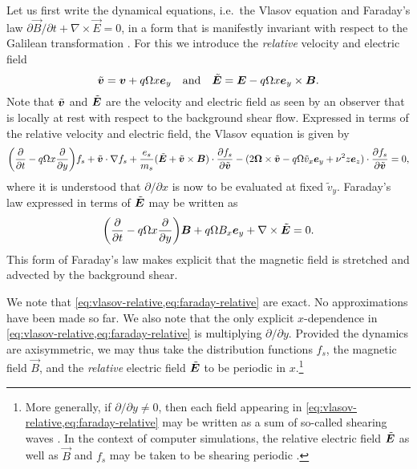 \documentclass[aps,pre,notitlepage,amsmath,amssymb,amsfonts,nobibnotes,nofootinbib]{revtex4-1}
\begin{document}
Let us first write the dynamical equations, i.e.\ the Vlasov equation
 and Faraday's law
$\partial\vec{B}/\partial{}t+\nabla\times\vec{E}=0$, in a form that is
manifestly invariant with respect to the Galilean transformation
. For this we introduce the \emph{relative}
velocity and electric field
\begin{equation}
  \label{eq:relative-quantities}
  \tvec{v} = \vec{v} + q\Omega x\ey
  \quad\textrm{and}\quad
  \tvec{E} = \vec{E} - q\Omega x\ey\times\vec{B}.
\end{equation}
Note that $\tilde{\bm{v}}$ and $\tilde{\bm{E}}$ are the velocity and electric field as
seen by an observer that is locally at rest with respect to the background
shear flow. Expressed in terms of the relative velocity and electric field,
the Vlasov equation is given by
\begin{equation}
  \label{eq:vlasov-relative}
  \left(\pder{}{t} - q\Omega x\pder{}{y}\right) f_s
  + \tilde{\vec{v}}\cdot\nabla f_s
  + \frac{\qs}{m_s}(\tilde{\vec{E}} + \tilde{\vec{v}}\times\vec{B})
  \cdot\pder{f_s}{\tilde{\vec{v}}}
  - (2\vec{\Omega}\times\tvec{v} - q\Omega\tilde{v}_x\ey + \vfreq^2 z\ez)
  \cdot\pder{f_s}{\tilde{\vec{v}}} = 0,
\end{equation}
where it is understood that $\partial/\partial{}x$ is now to be evaluated at
fixed $\tilde{v}_y$. Faraday's law expressed in terms of $\tilde{\bm{E}}$ may be
written as
\begin{equation}
  \label{eq:faraday-relative}
  \left(\pder{}{t} - q\Omega x\pder{}{y}\right)
  \vec{B} + q\Omega B_x\ey + \nabla\times\tilde{\vec{E}} = 0.
\end{equation}
This form of Faraday's law makes explicit that the magnetic field is stretched
and advected by the background shear.

We note that \cref{eq:vlasov-relative,eq:faraday-relative} are exact. No
approximations have been made so far. We also note that the only explicit
$x$-dependence in \cref{eq:vlasov-relative,eq:faraday-relative} is multiplying
$\partial/\partial{}y$. Provided the dynamics are axisymmetric, we may thus
take the distribution functions $f_s$, the magnetic field $\vec{B}$, and the
\emph{relative} electric field $\tilde{\bm{E}}$ to be periodic in $x$.\footnote{More
  generally, if $\partial/\partial{}y\ne0$, then each field appearing in
  \cref{eq:vlasov-relative,eq:faraday-relative} may be written as a sum of
  so-called shearing waves \citep{Thomson1887,Goldreich1965}. In the context
  of computer simulations, the relative electric field $\tilde{\bm{E}}$ as well as
  $\vec{B}$ and $f_s$ may be taken to be shearing periodic
  \citep{Lees1972,Hawley1995}.}
\end{document}
